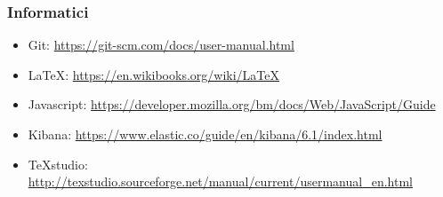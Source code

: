 	\subsubsection{Informatici}
	\begin{itemize}
		\item Git:
		\href{https://git-scm.com/docs/user-manual.html}{https://git-scm.com/docs/user-manual.html}
		
		\item \LaTeX:  \href{https://en.wikibooks.org/wiki/LaTeX}{https://en.wikibooks.org/wiki/LaTeX}
		
		\item Javascript:
		\href{https://developer.mozilla.org/bm/docs/Web/JavaScript/Guide}{https://developer.mozilla.org/bm/docs/Web/JavaScript/Guide}
		
		\item Kibana: \href{https://www.elastic.co/guide/en/kibana/6.1/index.html}{https://www.elastic.co/guide/en/kibana/6.1/index.html}
		
		\item TeXstudio: 
		\href{http://texstudio.sourceforge.net/manual/current/usermanual\_en.html}{http://texstudio.sourceforge.net/manual/current/usermanual\_en.html}
	\end{itemize}
	